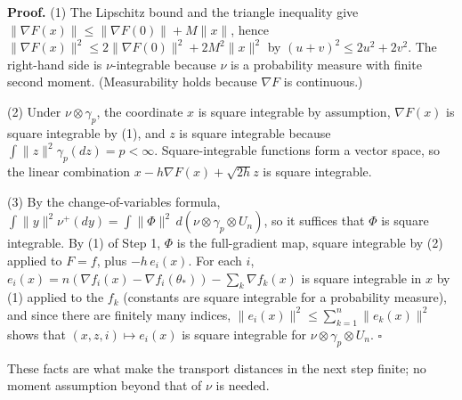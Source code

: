 \documentclass[11pt,a4paper]{report}
\begin{document}
\textbf{Proof.} (1) The Lipschitz bound and the triangle inequality give \(\|\nabla F(x)\|\le\|\nabla F(0)\|+M\|x\|\), hence \(\|\nabla F(x)\|^2\le2\|\nabla F(0)\|^2+2M^2\|x\|^2\) by \((u+v)^2\le2u^2+2v^2\). The right-hand side is \(\nu\)-integrable because \(\nu\) is a probability measure with finite second moment. (Measurability holds because \(\nabla F\) is continuous.)




(2) Under \(\nu\otimes\gamma_p\), the coordinate \(x\) is square integrable by assumption, \(\nabla F(x)\) is square integrable by (1), and \(z\) is square integrable because \(\int\|z\|^2\gamma_p(dz)=p<\infty\). Square-integrable functions form a vector space, so the linear combination \(x-h\nabla F(x)+\sqrt{2h}z\) is square integrable.




(3) By the change-of-variables formula, \(\int\|y\|^2\nu^+(dy)=\int\|\Phi\|^2\,d(\nu\otimes\gamma_p\otimes U_n)\), so it suffices that \(\Phi\) is square integrable. By (1) of Step 1, \(\Phi\) is the full-gradient map, square integrable by (2) applied to \(F=f\), plus \(-h\,e_i(x)\). For each \(i\), \(e_i(x)=n(\nabla f_i(x)-\nabla f_i(\theta_*))-\sum_k\nabla f_k(x)\) is square integrable in \(x\) by (1) applied to the \(f_k\) (constants are square integrable for a probability measure), and since there are finitely many indices, \(\|e_i(x)\|^2\le\sum_{k=1}^n\|e_k(x)\|^2\) shows that \((x,z,i)\mapsto e_i(x)\) is square integrable for \(\nu\otimes\gamma_p\otimes U_n\). \(\square\)




These facts are what make the transport distances in the next step finite; no moment assumption beyond that of \(\nu\) is needed.
\end{document}
